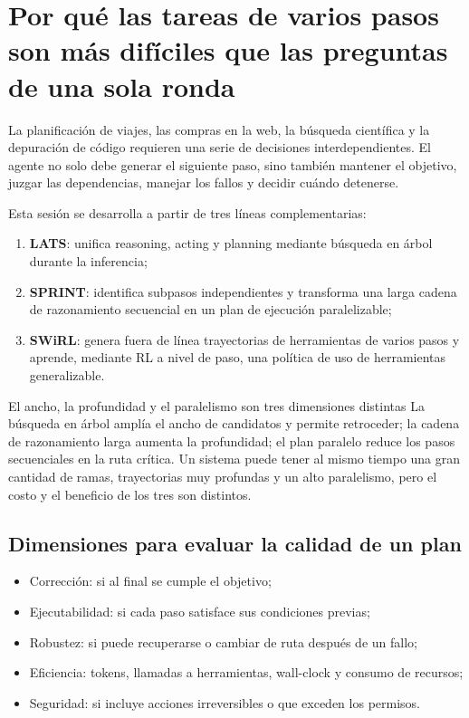 \section{Por qué las tareas de varios pasos son más difíciles que las preguntas de una sola ronda}

La planificación de viajes, las compras en la web, la búsqueda científica y la depuración de código requieren una serie de decisiones interdependientes. El agente no solo debe generar el siguiente paso, sino también mantener el objetivo, juzgar las dependencias, manejar los fallos y decidir cuándo detenerse.


Esta sesión se desarrolla a partir de tres líneas complementarias:

\begin{enumerate}
    \item \textbf{LATS}: unifica reasoning, acting y planning mediante búsqueda en árbol durante la inferencia;
    \item \textbf{SPRINT}: identifica subpasos independientes y transforma una larga cadena de razonamiento secuencial en un plan de ejecución paralelizable;
    \item \textbf{SWiRL}: genera fuera de línea trayectorias de herramientas de varios pasos y aprende, mediante RL a nivel de paso, una política de uso de herramientas generalizable.
\end{enumerate}

\begin{importantbox}{El ancho, la profundidad y el paralelismo son tres dimensiones distintas}
La búsqueda en árbol amplía el ancho de candidatos y permite retroceder; la cadena de razonamiento larga aumenta la profundidad; el plan paralelo reduce los pasos secuenciales en la ruta crítica. Un sistema puede tener al mismo tiempo una gran cantidad de ramas, trayectorias muy profundas y un alto paralelismo, pero el costo y el beneficio de los tres son distintos.
\end{importantbox}

\subsection{Dimensiones para evaluar la calidad de un plan}

\begin{itemize}
    \item Corrección: si al final se cumple el objetivo;
    \item Ejecutabilidad: si cada paso satisface sus condiciones previas;
    \item Robustez: si puede recuperarse o cambiar de ruta después de un fallo;
    \item Eficiencia: tokens, llamadas a herramientas, wall-clock y consumo de recursos;
    \item Seguridad: si incluye acciones irreversibles o que exceden los permisos.
\end{itemize}

